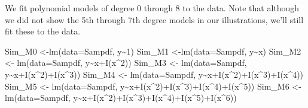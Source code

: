 \documentclass[
  letterpaper,
  DIV=11,
  numbers=noendperiod]{scrreprt}
\newenvironment{Shaded}{\begin{snugshade}}{\end{snugshade}}
\newcommand{\AttributeTok}[1]{\textcolor[rgb]{0.40,0.45,0.13}{#1}}
\newcommand{\DecValTok}[1]{\textcolor[rgb]{0.68,0.00,0.00}{#1}}
\newcommand{\FunctionTok}[1]{\textcolor[rgb]{0.28,0.35,0.67}{#1}}
\newcommand{\NormalTok}[1]{\textcolor[rgb]{0.00,0.23,0.31}{#1}}
\newcommand{\OtherTok}[1]{\textcolor[rgb]{0.00,0.23,0.31}{#1}}
\newcommand{\SpecialCharTok}[1]{\textcolor[rgb]{0.37,0.37,0.37}{#1}}
\begin{document}
We fit polynomial models of degree 0 through 8 to the data. Note that
although we did not show the 5th through 7th degree models in our
illustrations, we'll still fit these to the data.

\begin{Shaded}
\begin{Highlighting}[]
\NormalTok{Sim\_M0 }\OtherTok{\textless{}{-}}\FunctionTok{lm}\NormalTok{(}\AttributeTok{data=}\NormalTok{Sampdf, y}\SpecialCharTok{\textasciitilde{}}\DecValTok{1}\NormalTok{)}
\NormalTok{Sim\_M1 }\OtherTok{\textless{}{-}}\FunctionTok{lm}\NormalTok{(}\AttributeTok{data=}\NormalTok{Sampdf, y}\SpecialCharTok{\textasciitilde{}}\NormalTok{x)}
\NormalTok{Sim\_M2 }\OtherTok{\textless{}{-}} \FunctionTok{lm}\NormalTok{(}\AttributeTok{data=}\NormalTok{Sampdf, y}\SpecialCharTok{\textasciitilde{}}\NormalTok{x}\SpecialCharTok{+}\FunctionTok{I}\NormalTok{(x}\SpecialCharTok{\^{}}\DecValTok{2}\NormalTok{))}
\NormalTok{Sim\_M3 }\OtherTok{\textless{}{-}} \FunctionTok{lm}\NormalTok{(}\AttributeTok{data=}\NormalTok{Sampdf, y}\SpecialCharTok{\textasciitilde{}}\NormalTok{x}\SpecialCharTok{+}\FunctionTok{I}\NormalTok{(x}\SpecialCharTok{\^{}}\DecValTok{2}\NormalTok{)}\SpecialCharTok{+}\FunctionTok{I}\NormalTok{(x}\SpecialCharTok{\^{}}\DecValTok{3}\NormalTok{))}
\NormalTok{Sim\_M4 }\OtherTok{\textless{}{-}} \FunctionTok{lm}\NormalTok{(}\AttributeTok{data=}\NormalTok{Sampdf, y}\SpecialCharTok{\textasciitilde{}}\NormalTok{x}\SpecialCharTok{+}\FunctionTok{I}\NormalTok{(x}\SpecialCharTok{\^{}}\DecValTok{2}\NormalTok{)}\SpecialCharTok{+}\FunctionTok{I}\NormalTok{(x}\SpecialCharTok{\^{}}\DecValTok{3}\NormalTok{)}\SpecialCharTok{+}\FunctionTok{I}\NormalTok{(x}\SpecialCharTok{\^{}}\DecValTok{4}\NormalTok{))}
\NormalTok{Sim\_M5 }\OtherTok{\textless{}{-}} \FunctionTok{lm}\NormalTok{(}\AttributeTok{data=}\NormalTok{Sampdf, y}\SpecialCharTok{\textasciitilde{}}\NormalTok{x}\SpecialCharTok{+}\FunctionTok{I}\NormalTok{(x}\SpecialCharTok{\^{}}\DecValTok{2}\NormalTok{)}\SpecialCharTok{+}\FunctionTok{I}\NormalTok{(x}\SpecialCharTok{\^{}}\DecValTok{3}\NormalTok{)}\SpecialCharTok{+}\FunctionTok{I}\NormalTok{(x}\SpecialCharTok{\^{}}\DecValTok{4}\NormalTok{)}\SpecialCharTok{+}\FunctionTok{I}\NormalTok{(x}\SpecialCharTok{\^{}}\DecValTok{5}\NormalTok{))}
\NormalTok{Sim\_M6 }\OtherTok{\textless{}{-}} \FunctionTok{lm}\NormalTok{(}\AttributeTok{data=}\NormalTok{Sampdf, y}\SpecialCharTok{\textasciitilde{}}\NormalTok{x}\SpecialCharTok{+}\FunctionTok{I}\NormalTok{(x}\SpecialCharTok{\^{}}\DecValTok{2}\NormalTok{)}\SpecialCharTok{+}\FunctionTok{I}\NormalTok{(x}\SpecialCharTok{\^{}}\DecValTok{3}\NormalTok{)}\SpecialCharTok{+}\FunctionTok{I}\NormalTok{(x}\SpecialCharTok{\^{}}\DecValTok{4}\NormalTok{)}\SpecialCharTok{+}\FunctionTok{I}\NormalTok{(x}\SpecialCharTok{\^{}}\DecValTok{5}\NormalTok{)}\SpecialCharTok{+}\FunctionTok{I}\NormalTok{(x}\SpecialCharTok{\^{}}\DecValTok{6}\NormalTok{))}

\end{Highlighting}
\end{Shaded}
\end{document}
